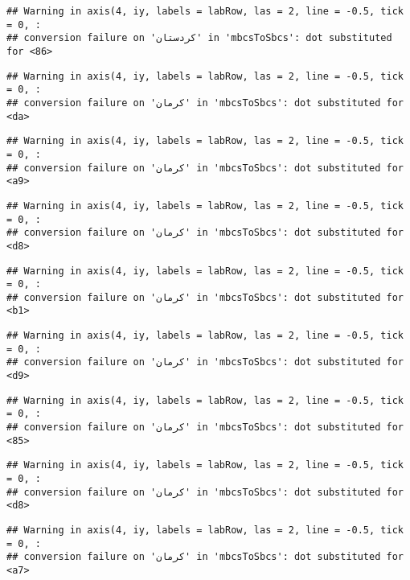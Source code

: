 \documentclass[
]{article}
\begin{document}
\begin{verbatim}
## Warning in axis(4, iy, labels = labRow, las = 2, line = -0.5, tick = 0, :
## conversion failure on 'کردستان' in 'mbcsToSbcs': dot substituted for <86>
\end{verbatim}

\begin{verbatim}
## Warning in axis(4, iy, labels = labRow, las = 2, line = -0.5, tick = 0, :
## conversion failure on 'کرمان' in 'mbcsToSbcs': dot substituted for <da>
\end{verbatim}

\begin{verbatim}
## Warning in axis(4, iy, labels = labRow, las = 2, line = -0.5, tick = 0, :
## conversion failure on 'کرمان' in 'mbcsToSbcs': dot substituted for <a9>
\end{verbatim}

\begin{verbatim}
## Warning in axis(4, iy, labels = labRow, las = 2, line = -0.5, tick = 0, :
## conversion failure on 'کرمان' in 'mbcsToSbcs': dot substituted for <d8>
\end{verbatim}

\begin{verbatim}
## Warning in axis(4, iy, labels = labRow, las = 2, line = -0.5, tick = 0, :
## conversion failure on 'کرمان' in 'mbcsToSbcs': dot substituted for <b1>
\end{verbatim}

\begin{verbatim}
## Warning in axis(4, iy, labels = labRow, las = 2, line = -0.5, tick = 0, :
## conversion failure on 'کرمان' in 'mbcsToSbcs': dot substituted for <d9>
\end{verbatim}

\begin{verbatim}
## Warning in axis(4, iy, labels = labRow, las = 2, line = -0.5, tick = 0, :
## conversion failure on 'کرمان' in 'mbcsToSbcs': dot substituted for <85>
\end{verbatim}

\begin{verbatim}
## Warning in axis(4, iy, labels = labRow, las = 2, line = -0.5, tick = 0, :
## conversion failure on 'کرمان' in 'mbcsToSbcs': dot substituted for <d8>
\end{verbatim}

\begin{verbatim}
## Warning in axis(4, iy, labels = labRow, las = 2, line = -0.5, tick = 0, :
## conversion failure on 'کرمان' in 'mbcsToSbcs': dot substituted for <a7>
\end{verbatim}
\end{document}
